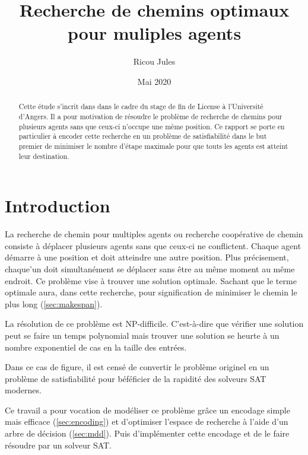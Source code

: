 \documentclass[french, 10pt, letterpaper]{article}
\title{Recherche de chemins optimaux pour muliples agents}
\author{Ricou Jules}
\date{Mai 2020}
\theoremstyle{definition}
\theoremstyle{proposition}
\theoremstyle{example}
\begin{document}
    \maketitle

    \begin{abstract}
        Cette étude s'incrit dans dans le cadre du stage de fin de License à l'Université d'Angers. 
        Il a pour motivation de résoudre le problème de recherche de chemins pour plusieurs agents sans
        que ceux-ci n'occupe une même position.
        Ce rapport se porte en particulier à encoder cette recherche en un problème de satisfiabilité
        dans le but premier de minimiser le nombre d'étape maximale pour que touts les agents est atteint leur destination.
    \end{abstract}

    \newpage

    \tableofcontents

    \newpage
    \section*{Introduction}

    La recherche de chemin pour multiples agents ou recherche coopérative de chemin consiste à déplacer plusieurs agents sans que ceux-ci ne conflictent.
    Chaque agent démarre à une position et doit atteindre une autre position. 
    Plus précisement, chaque'un doit simultanément se déplacer sans être au même moment au même endroit.
    Ce problème vise à trouver une solution optimale.
    Sachant que le terme optimale aura, dans cette recherche, pour signification de minimiser le chemin
    le plus long (\ref{sec:makespan}).

    La résolution de ce problème est NP-difficile. 
    C'est-à-dire que vérifier une solution peut se faire un temps polynomial mais trouver une solution se heurte à un nombre exponentiel
    de cas en la taille des entrées.

    Dans ce cas de figure, il est censé de convertir le problème originel en un problème de satisfiabilité
    pour béféficier de la rapidité des solveurs SAT modernes. 

    Ce travail a pour vocation de modéliser ce problème grâce un encodage simple mais efficace \cite{PSUR16} (\ref{sec:encoding})
    et d'optimiser l'espace de recherche à l'aide d'un arbre de décision (\ref{sec:mdd}).
    Puis d'implémenter cette encodage et de le faire résoudre par un solveur SAT.
\end{document}
